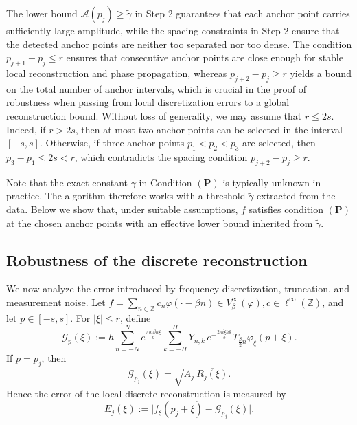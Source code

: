 \documentclass[11pt, reqno]{amsart}
\newcommand{\Z}{\mathbb{Z}}
\numberwithin{equation}{section}
\begin{document}
The lower bound $\mathcal A(p_j)\ge \widetilde\gamma$ in Step 2  guarantees that each anchor point carries sufficiently large amplitude, while the spacing constraints  in Step 2 ensure that the detected anchor points are neither too separated nor too dense.  The condition $
p_{j+1}-p_j\le  r$ ensures that consecutive anchor points are close enough for stable local reconstruction and phase propagation, whereas $p_{j+2}-p_j\ge  r$ yields a bound on the total number of anchor intervals, which is crucial in the proof of robustness when passing from local discretization errors to a global reconstruction bound.  Without loss of generality, we may assume that $ r\le 2 s$. Indeed, if $r>2s$, then at most two anchor points can be selected in the interval $[-s,s]$. Otherwise, if three anchor points $p_1<p_2<p_3$ are selected, then $p_3-p_1\le 2s<r$, which contradicts the spacing condition $p_{j+2}-p_j\ge r$. 



Note that the exact constant $\gamma$ in Condition $(\mathbf P)$ is typically unknown in practice. The algorithm therefore works with a threshold $\widetilde\gamma$ extracted from the data. Below we show that, under suitable assumptions, $f$ satisfies condition $(\mathbf P)$ at the chosen anchor points with an effective lower bound inherited from $\widetilde\gamma$.


    

    

\subsection{Robustness of the discrete reconstruction}

We now analyze the error introduced by frequency discretization, truncation, and measurement noise. Let $ f=\sum_{n\in\Z} c_n\varphi(\cdot-\beta n)\in V_\beta^\infty(\varphi), c\in\ell^\infty(\Z)$,
and let $p\in[-s,s]$. For $|\xi|\le r$, define
\begin{equation}\label{eq:Gp-def}
\mathcal G_p(\xi) := h\sum_{n=-N}^{N} e^{\frac{\pi ia\beta n\xi}{b}}
\sum_{k=-H}^{H}Y_{n,k}\,e^{-\frac{2\pi i\xi hk}{b}}T_{\frac{\beta}{2}n}\widetilde{\varphi_\xi}(p+\xi).
\end{equation}
If $p=p_j$, then
$$ \mathcal G_{p_j}(\xi)=\sqrt{A_j}\,\overline{R_j(\xi)}.$$
Hence the error of the local discrete reconstruction is measured by
\begin{equation}\label{eq:Ej-def}
E_j(\xi):=\bigl|f_\xi(p_j+\xi)-\mathcal G_{p_j}(\xi)\bigr|.
\end{equation}
\end{document}
